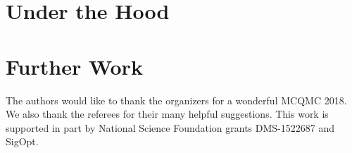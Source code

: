 \documentclass[graybox,footinfo]{svmult}
\begin{document}
\section{Under the Hood}



\section{Further Work} \label{sec:further}


\begin{acknowledgement}
The authors would like to thank the organizers for a wonderful MCQMC 2018. 
We also thank the referees for their many helpful suggestions.  This work is supported in part by National Science Foundation grants DMS-1522687 and SigOpt.


\end{acknowledgement}



\end{document}
